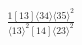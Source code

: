 \documentclass[varwidth, border=5pt]{standalone}
\begin{document}
\begin{my}
$\begin{gathered}
\scriptscriptstyle\frac{1[13]⟨34⟩⟨35⟩^2}{⟨13⟩^2[14]⟨23⟩^2}
\end{gathered}$
\end{my}
\end{document}
